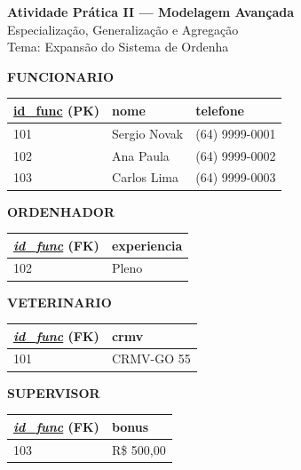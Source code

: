 \documentclass[12pt]{article}
\begin{document}
\begin{center}
    \Large \textbf{Atividade Prática II — Modelagem Avançada} \\
    \normalsize Especialização, Generalização e Agregação \\
    \normalsize Tema: Expansão do Sistema de Ordenha
\end{center}

\vspace{0.3cm}
\begin{table}[H]
    \centering
    \footnotesize 

    \textbf{FUNCIONARIO}\\
    \begin{tabular}{|l|l|l|}
    \hline
    \rowcolor{tableheader} \underline{id\_func} (PK) & nome & telefone \\ \hline
    101 & Sergio Novak & (64) 9999-0001 \\ \hline
    102 & Ana Paula & (64) 9999-0002 \\ \hline
    103 & Carlos Lima & (64) 9999-0003 \\ \hline
    \end{tabular}

    \vspace{0.4cm}

    \begin{minipage}{0.31\textwidth}
        \centering
        \textbf{ORDENHADOR}\\
        \begin{tabular}{|l|l|}
        \hline
        \rowcolor{tableheader} \underline{\textit{id\_func}} (FK) & experiencia \\ \hline
        102 & Pleno \\ \hline
        \end{tabular}
    \end{minipage}
    \begin{minipage}{0.31\textwidth}
        \centering
        \textbf{VETERINARIO}\\
        \begin{tabular}{|l|l|}
        \hline
        \rowcolor{tableheader} \underline{\textit{id\_func}} (FK) & crmv \\ \hline
        101 & CRMV-GO 55 \\ \hline
        \end{tabular}
    \end{minipage}
    \begin{minipage}{0.31\textwidth}
        \centering
        \textbf{SUPERVISOR}\\
        \begin{tabular}{|l|l|}
        \hline
        \rowcolor{tableheader} \underline{\textit{id\_func}} (FK) & bonus \\ \hline
        103 & R\$ 500,00 \\ \hline
        \end{tabular}
    \end{minipage}


\end{table}
\end{document}
